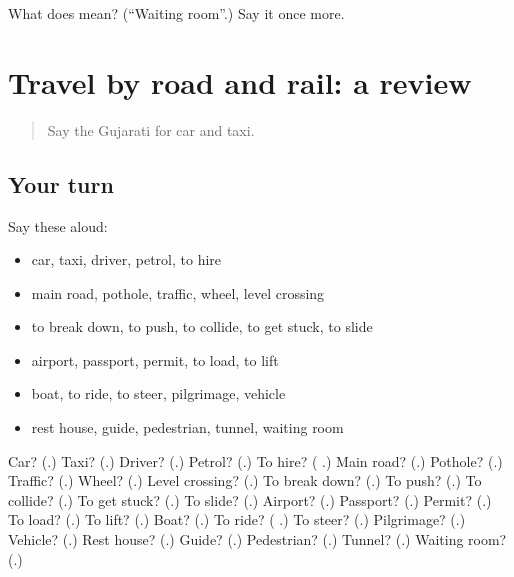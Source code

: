 \begin{tcolorbox}[breakable,colback=teal!4,colframe=teal!35!black,title={Before you move on}]
What does  mean? (\textquotedblleft{}Waiting room\textquotedblright{}.) Say it once more.
\end{tcolorbox}
\section[(dialogue)]{Travel by road and rail: a review}

\label{lesson:GU-R212-review-207-212}



\begin{quote}
Say the Gujarati for car and taxi.
\end{quote}

\subsection*{Your turn}
Say these aloud:

\begin{itemize}
\raggedright
  \item car, taxi, driver, petrol, to hire
  \item main road, pothole, traffic, wheel, level crossing
  \item to break down, to push, to collide, to get stuck, to slide
  \item airport, passport, permit, to load, to lift
  \item boat, to ride, to steer, pilgrimage, vehicle
  \item rest house, guide, pedestrian, tunnel, waiting room
\end{itemize}

\begin{tcolorbox}[breakable,colback=teal!4,colframe=teal!35!black,title={Before you move on}]
Car? (\textbf{}.) Taxi? (\textbf{}.) Driver? (\textbf{}.) Petrol? (\textbf{}.) To hire? (\textbf{ }.) Main road? (\textbf{}.) Pothole? (\textbf{}.) Traffic? (\textbf{}.) Wheel? (\textbf{}.) Level crossing? (\textbf{}.) To break down? (\textbf{}.) To push? (\textbf{}.) To collide? (\textbf{}.) To get stuck? (\textbf{}.) To slide? (\textbf{}.) Airport? (\textbf{}.) Passport? (\textbf{}.) Permit? (\textbf{}.) To load? (\textbf{}.) To lift? (\textbf{}.) Boat? (\textbf{}.) To ride? (\textbf{ }.) To steer? (\textbf{}.) Pilgrimage? (\textbf{}.) Vehicle? (\textbf{}.) Rest house? (\textbf{}.) Guide? (\textbf{}.) Pedestrian? (\textbf{}.) Tunnel? (\textbf{}.) Waiting room? (\textbf{}.)
\end{tcolorbox}
